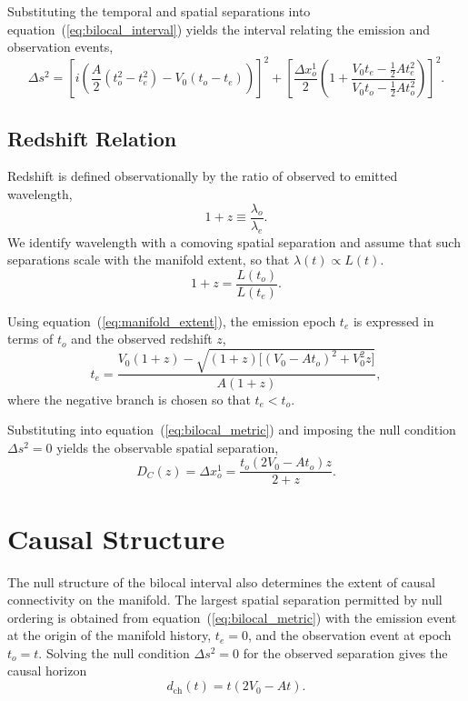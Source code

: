 \documentclass[fontsize=12pt, paper=a4]{scrartcl}
\begin{document}
Substituting the temporal and spatial separations into equation~(\ref{eq:bilocal_interval}) yields the interval relating the emission and observation events,
\begin{equation}
\Delta s^2 = \left[i\left(\frac{A}{2}\left(t_o^2 - t_e^2\right) - V_0\left(t_o - t_e\right)\right)\right]^2+ \left[\frac{\Delta x_o^1}{2}\left(1 + \frac{V_0 t_e - \frac{1}{2}A t_e^2}{V_0 t_o - \frac{1}{2}A t_o^2}\right)\right]^2 .
\label{eq:bilocal_metric}
\end{equation}

\subsection{Redshift Relation}

Redshift is defined observationally by the ratio of observed to emitted wavelength,
\begin{equation}
1+z \equiv \frac{\lambda_o}{\lambda_e}.
\end{equation}
We identify wavelength with a comoving spatial separation and assume that such separations scale with the manifold extent, so that $\lambda(t) \propto L(t)$.
\begin{equation}
1+z = \frac{L(t_o)}{L(t_e)}.
\label{eq:redshift_relation}
\end{equation}

Using equation~(\ref{eq:manifold_extent}), the emission epoch $t_e$ is expressed in terms of $t_o$ and the observed redshift $z$,
\begin{equation}
t_e = \frac{V_0(1+z) - \sqrt{(1+z)\big[(V_0 - A t_o)^2 + V_0^2 z\big]}}{A(1+z)},
\label{eq:te_solution}
\end{equation}
where the negative branch is chosen so that $t_e < t_o$.

Substituting into equation~(\ref{eq:bilocal_metric}) and imposing the null condition $\Delta s^2 = 0$ yields the observable spatial separation,
\begin{equation}
D_C(z)= \Delta x_o^1= \frac{t_o\left(2V_0 - A t_o\right) z}{2 + z}.
\label{eq:distance_redshift_relation}
\end{equation}

\section{Causal Structure}

The null structure of the bilocal interval also determines the extent of causal connectivity on the manifold. The largest spatial separation permitted by null ordering is obtained from equation~(\ref{eq:bilocal_metric}) with the emission event at the origin of the manifold history, $t_e = 0$, and the observation event at epoch $t_o = t$. Solving the null condition $\Delta s^2 = 0$ for the observed separation gives the causal horizon
\begin{equation}
d_{\mathrm{ch}}(t) = t\left(2V_0 - A t\right) .
\end{equation}
\end{document}
